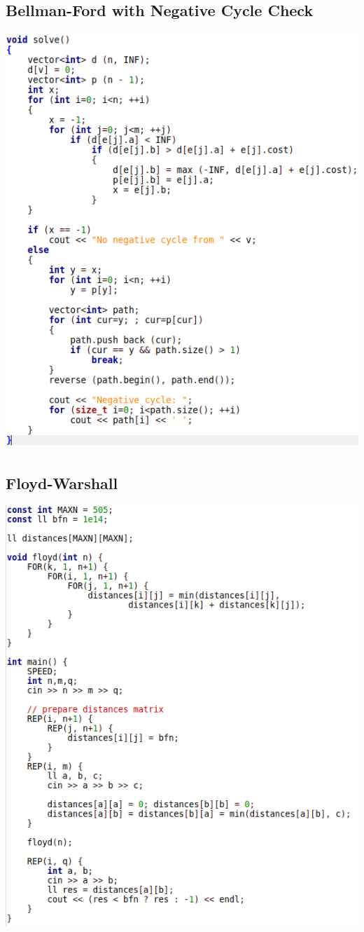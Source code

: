 \documentclass[11pt,twocolumn]{article}
\begin{document}
\subsection{Bellman-Ford with Negative Cycle Check}
\includegraphics[scale=0.5]{bellmanfordneg}
\subsection{Floyd-Warshall}
\includegraphics[scale=0.4]{floyd}
\end{document}
